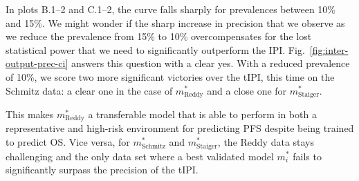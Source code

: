 In plots B.1--2 and C.1--2, the curve falls sharply for prevalences between \num{10}\% and \num{15}\%. 
We might wonder if the sharp increase in precision that we observe as we reduce the prevalence 
from \num{15}\% to \num{10}\% overcompensates for the lost statistical power that we need to 
significantly outperform the IPI. Fig.\ \ref{fig:inter-output-prec-ci} answers this question with a 
clear yes. With a reduced prevalence of \num{10}\%, we score two more significant victories over the 
tIPI, this time on the Schmitz data: a clear one in the case of $m^*_\text{Reddy}$ and a close one
for $m^*_\text{Staiger}$. 

This makes $m^*_\text{Reddy}$ a transferable model that is 
able to perform in both a representative and high-risk environment for predicting PFS despite being 
trained to predict OS. Vice versa, for $m^*_\text{Schmitz}$ and $m^*_\text{Staiger}$, the Reddy data 
stays challenging and the only data set where a best validated model $m^*_i$ fails to significantly 
surpass the precision of the tIPI.